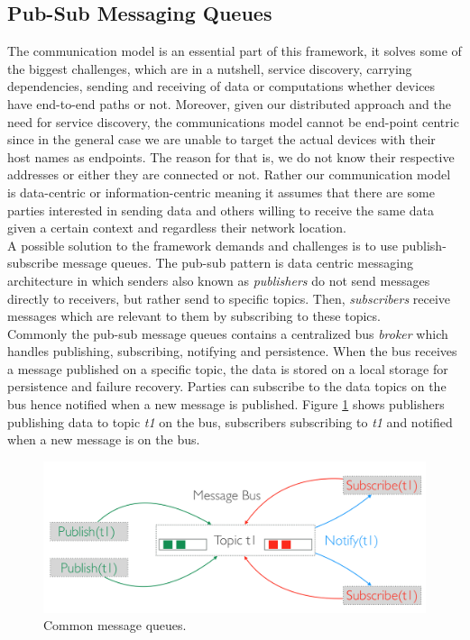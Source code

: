 \subsection{Pub-Sub Messaging Queues}\label{subsec:pub-sub}

The communication model is an essential part of this framework, it solves some of the biggest challenges, which are in a nutshell, service discovery, carrying dependencies, sending and receiving of data or computations whether devices have  end-to-end paths or not. Moreover, given our distributed approach and the need for service discovery, the communications model cannot be  end-point centric since in the general case we are unable to target the actual devices with their host names as endpoints. The reason for that is, we do not know their respective addresses or either they are connected or not. Rather our communication model is data-centric or information-centric meaning it assumes that there are some parties interested in sending data and others willing to receive the same data given a certain context and regardless their network location. \\

 

\noindent A possible solution to the framework demands and challenges is to use publish-subscribe message queues. The pub-sub pattern is data centric messaging architecture in which senders also known as \textit{publishers} do not send messages directly to receivers, but rather send to specific topics. Then, \textit{subscribers} receive messages which are relevant to them by subscribing to these topics. \\


\noindent Commonly the pub-sub message queues contains a centralized bus \textit{broker} which handles publishing, subscribing, notifying and persistence. 
When the bus receives a message published on a specific topic, the data is stored on a local storage for persistence and failure recovery. 
Parties can subscribe to the data topics on the  bus hence notified when a new message is published. Figure \ref{fig:message-queues} shows  publishers publishing data to topic \textit{t1} on the bus, subscribers subscribing to \textit{t1} and notified when a new message is on the bus.
	
\begin{figure}[H]
	\centering
	\includegraphics[scale=0.3]{images/message-queues.png}
	\caption{Common message queues.}
	\label{fig:message-queues}
\end{figure}

